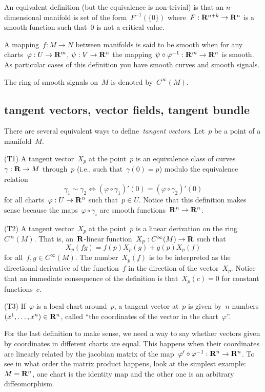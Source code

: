 An equivalent definition (but the equivalence is non-trivial) is that an
$n$-dimensional manifold is set of the form~$F^{-1}(\{0\})$
where~$F:\mathbf{R}^{n+k}\to\mathbf{R}^n$ is a smooth function such that~$0$ is not a
critical value.

A mapping~$f:M\to N$ between manifolds is said to be smooth when for any
charts~$\varphi:U\to\mathbf{R}^m$, $\psi:V\to\mathbf{R}^n$ the
mapping~$\psi\circ\varphi^{-1}:\mathbf{R}^m\to\mathbf{R}^n$ is smooth.
As particular cases  of this definition you have smooth curves and smooth
signals.

The ring of smooth signals on~$M$ is denoted by~$C^\infty(M)$.

\subsection{tangent vectors, vector fields, tangent bundle}

There are several equivalent ways to define~\emph{tangent vectors}.
Let~$p$ be a point of a manifold~$M$.

(T1) A tangent vector~$X_p$ at the point~$p$ is an equivalence class of
curves~$\gamma:\mathbf{R}\to M$ through~$p$ (i.e., such that~$\gamma(0)=p$)
modulo the equivalence relation
\[
	\gamma_1\sim\gamma_2
	\iff
		(\varphi\circ\gamma_1)'(0)=(\varphi\circ\gamma_2)'(0)
\]
for all charts~$\varphi:U\to\mathbf{R}^n$ such that~$p\in U$.  Notice that this
definition makes sense because the maps~$\varphi\circ\gamma_i$ are smooth
functions~$\mathbf{R}^n\to\mathbf{R}^n$.

(T2) A tangent vector~$X_p$ at the point~$p$ is a linear derivation on the
ring~$C^\infty(M)$.  That is, an~$\mathbf{R}$-linear function~$X_p:C^\infty(M)\to\mathbf{R}$
such that
\[
	X_p(fg)=f(p)X_p(g) + g(p)X_p(f)
\]
for all~$f,g\in C^\infty(M)$.  The number~$X_p(f)$ is to be interpreted as
the directional derivative of the function~$f$ in the direction of the
vector~$X_p$.  Notice that an immediate consequence of the definition is
that~$X_p(c)=0$ for constant functions~$c$.

(T3) If~$\varphi$ is a local chart around~$p$, a tangent vector at~$p$ is
given by~$n$ numbers~$(x^1,\ldots,x^n)\in\mathbf{R}^n$, called ``the coordinates of
the vector in the chart~$\varphi$''.

For the last definition to make sense, we need a way to say whether vectors
given by coordinates in different charts are equal.  This happens when their
coordinates are linearly related by the jacobian matrix of the
map~$\varphi'\circ\varphi^{-1}:\mathbf{R}^n\to\mathbf{R}^n$.  To see in what order the
matrix product happens, look at the simplest example:~$M=\mathbf{R}^n$, one chart is
the identity map and the other one is an arbitrary diffeomorphism.

